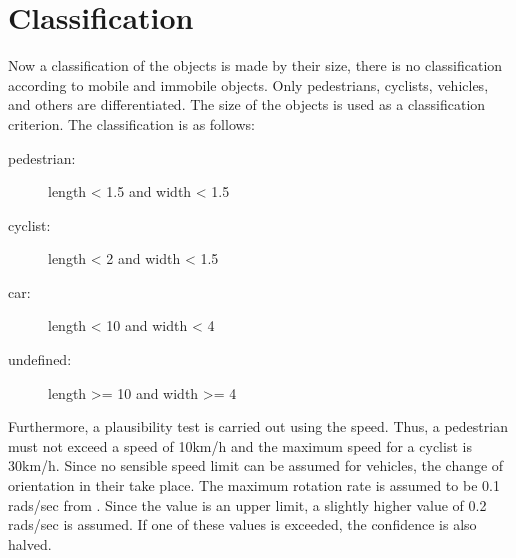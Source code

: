 \documentclass[11pt,oneside,openright]{mpreport}
\begin{document}
\section{Classification}
Now a classification of the objects is made by their size, there is no classification according to mobile and immobile objects.
Only pedestrians, cyclists, vehicles, and others are differentiated. The size of the objects is used as a classification criterion.
The classification is as follows:
\begin{description}
\item[pedestrian:] length < 1.5 and width < 1.5
\item[cyclist:] length < 2 and width < 1.5
\item[car:] length < 10 and width < 4
\item[undefined:] length >= 10 and width >= 4
\end{description}


Furthermore, a plausibility test is carried out using the speed. Thus, a pedestrian must not exceed a speed of 10km/h and the maximum speed for a cyclist is 30km/h.
Since no sensible speed limit can be assumed for vehicles, the change of orientation in their take place.
The maximum rotation rate is assumed to be 0.1 rads/sec from \cite{Kelly1994}. Since the value is an upper limit, a slightly higher value of 0.2 rads/sec is assumed.
If one of these values is exceeded, the confidence is also halved.
\end{document}
